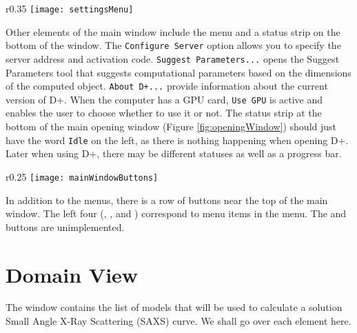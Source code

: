 \documentclass[../D+Manual.tex]{subfiles}
\begin{document}
\begin{wrapfigure}{r}{0.35\textwidth}
	\centering
	\texttt{[image: settingsMenu]}
\end{wrapfigure}
Other elements of the main window include the  menu and a status strip on the bottom of the  window.
The \texttt{Configure Server} option allows you to specify the server address and activation code. \texttt{Suggest Parameters...} opens the Suggest Parameters tool that suggests computational parameters based on the dimensions of the computed object. \texttt{About D+...} provide information about the current version of D+. When the computer has a GPU card, \texttt{Use GPU} is active and enables the user to choose whether to use it or not.
The status strip at the bottom of the main opening window (Figure \ref{fig:openingWindow}) should just have the word \texttt{Idle} on the left, as there is nothing happening when opening D+.
Later when using D+, there may be different statuses as well as a progress bar.

\begin{wrapfigure}[2]{r}{0.25\textwidth}
	\vspace{-7pt}
	\centering
	\texttt{[image: mainWindowButtons]}
\end{wrapfigure}

In addition to the menus, there is a row of buttons near the top of the main window. The left four (, ,  and ) correspond to menu items in the  menu. The  and  buttons are unimplemented.

\section{Domain View} \label{sec:domainView}

The  window contains the list of models that will be used to calculate a solution Small Angle X-Ray Scattering (SAXS) curve. We shall go over each element here.
\end{document}
